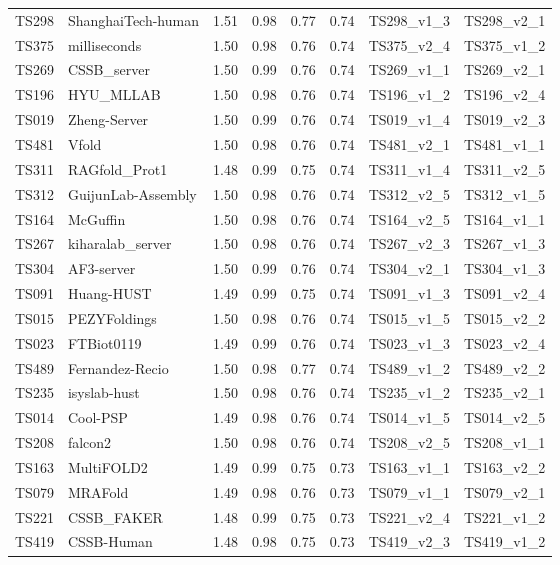 \begin{longtable}{llllllll}
TS298 & ShanghaiTech-human & 1.51 & 0.98 & 0.77 & 0.74 & TS298\_v1\_3 & TS298\_v2\_1 \\ 
TS375 & milliseconds & 1.50 & 0.98 & 0.76 & 0.74 & TS375\_v2\_4 & TS375\_v1\_2 \\ 
TS269 & CSSB\_server & 1.50 & 0.99 & 0.76 & 0.74 & TS269\_v1\_1 & TS269\_v2\_1 \\ 
TS196 & HYU\_MLLAB & 1.50 & 0.98 & 0.76 & 0.74 & TS196\_v1\_2 & TS196\_v2\_4 \\ 
TS019 & Zheng-Server & 1.50 & 0.99 & 0.76 & 0.74 & TS019\_v1\_4 & TS019\_v2\_3 \\ 
TS481 & Vfold & 1.50 & 0.98 & 0.76 & 0.74 & TS481\_v2\_1 & TS481\_v1\_1 \\ 
TS311 & RAGfold\_Prot1 & 1.48 & 0.99 & 0.75 & 0.74 & TS311\_v1\_4 & TS311\_v2\_5 \\ 
TS312 & GuijunLab-Assembly & 1.50 & 0.98 & 0.76 & 0.74 & TS312\_v2\_5 & TS312\_v1\_5 \\ 
TS164 & McGuffin & 1.50 & 0.98 & 0.76 & 0.74 & TS164\_v2\_5 & TS164\_v1\_1 \\ 
TS267 & kiharalab\_server & 1.50 & 0.98 & 0.76 & 0.74 & TS267\_v2\_3 & TS267\_v1\_3 \\ 
TS304 & AF3-server & 1.50 & 0.99 & 0.76 & 0.74 & TS304\_v2\_1 & TS304\_v1\_3 \\ 
TS091 & Huang-HUST & 1.49 & 0.99 & 0.75 & 0.74 & TS091\_v1\_3 & TS091\_v2\_4 \\ 
TS015 & PEZYFoldings & 1.50 & 0.98 & 0.76 & 0.74 & TS015\_v1\_5 & TS015\_v2\_2 \\ 
TS023 & FTBiot0119 & 1.49 & 0.99 & 0.76 & 0.74 & TS023\_v1\_3 & TS023\_v2\_4 \\ 
TS489 & Fernandez-Recio & 1.50 & 0.98 & 0.77 & 0.74 & TS489\_v1\_2 & TS489\_v2\_2 \\ 
TS235 & isyslab-hust & 1.50 & 0.98 & 0.76 & 0.74 & TS235\_v1\_2 & TS235\_v2\_1 \\ 
TS014 & Cool-PSP & 1.49 & 0.98 & 0.76 & 0.74 & TS014\_v1\_5 & TS014\_v2\_5 \\ 
TS208 & falcon2 & 1.50 & 0.98 & 0.76 & 0.74 & TS208\_v2\_5 & TS208\_v1\_1 \\ 
TS163 & MultiFOLD2 & 1.49 & 0.99 & 0.75 & 0.73 & TS163\_v1\_1 & TS163\_v2\_2 \\ 
TS079 & MRAFold & 1.49 & 0.98 & 0.76 & 0.73 & TS079\_v1\_1 & TS079\_v2\_1 \\ 
TS221 & CSSB\_FAKER & 1.48 & 0.99 & 0.75 & 0.73 & TS221\_v2\_4 & TS221\_v1\_2 \\ 
TS419 & CSSB-Human & 1.48 & 0.98 & 0.75 & 0.73 & TS419\_v2\_3 & TS419\_v1\_2 \\ 

\end{longtable}
